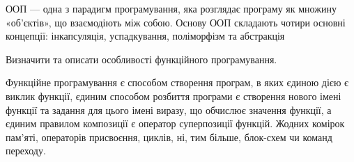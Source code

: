 \documentclass[a4paper, 12pt, oneside]{extarticle}
\begin{document}
\begin{itemize}
ООП --- одна з парадигм програмування, яка розглядає програму як множину «об'єктів», що взаємодіють між собою. Основу ООП складають чотири основні концепції: інкапсуляція, успадкування, поліморфізм та абстракція

\question Визначити та описати особливості функційного програмування.

\answer Функційне програмування є способом створення програм, в яких єдиною дією є виклик функції, єдиним способом розбиття програми є створення нового імені функції та задання для цього імені виразу, що обчислює значення функції, а єдиним правилом композиції є оператор суперпозиції функцій. Жодних комірок пам'яті, операторів присвоєння, циклів, ні, тим більше, блок-схем чи команд переходу.

\end{itemize}
\end{document}
